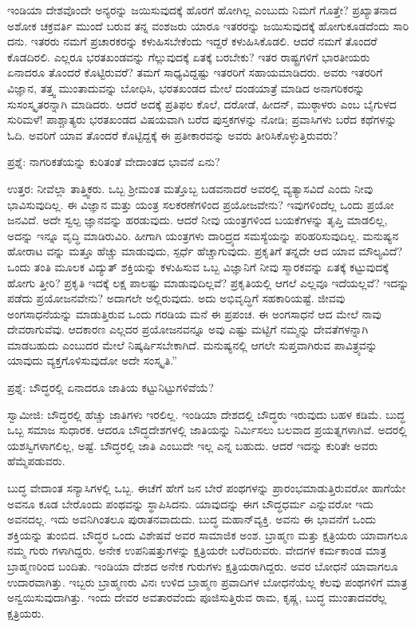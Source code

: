 ಇಂಡಿಯಾ ದೇಶವೊಂದೇ ಅನ್ಯರನ್ನು ಜಯಿಸುವುದಕ್ಕೆ ಹೊರಗೆ ಹೋಗಿಲ್ಲ ಎಂಬುದು ನಿಮಗೆ ಗೊತ್ತೇ? ಪ್ರಖ್ಯಾತನಾದ ಅಶೋಕ ಚಕ್ರವರ್ತಿ ಮುಂದೆ ಬರುವ ತನ್ನ ವಂಶಜರು ಯಾರೂ ಇತರರನ್ನು ಜಯಿಸುವುದಕ್ಕೆ ಹೋಗುಕೂಡದೆಂದು ಸಾರಿ ದನು. ಇತರರು ನಮಗೆ ಪ್ರಚಾರಕರನ್ನು ಕಳುಹಿಸಬೇಕೆಂದು ಇದ್ದರೆ ಕಳುಹಿಸಿಕೊಡಲಿ. ಆದರೆ ನಮಗೆ ತೊಂದರೆ ಕೊಡದಿರಲಿ. ಎಲ್ಲರೂ ಭರತಖಂಡವನ್ನು ಗೆಲ್ಲುವುದಕ್ಕೆ ಏತಕ್ಕೆ ಬರಬೇಕು? ಇತರ ರಾಷ್ಟ್ರಗಳಿಗೆ ಭಾರತೀಯರು ಏನಾದರೂ ತೊಂದರೆ ಕೊಟ್ಟಿರುವರೆ? ತಮಗೆ ಸಾಧ್ಯವಿದ್ದಷ್ಟು ಇತರರಿಗೆ ಸಹಾಯಮಾಡಿದರು. ಅವರು ಇತರರಿಗೆ ವಿಜ್ಞಾನ, ತತ್ತ್ವ ಮುಂತಾದುವನ್ನು ಬೋಧಿಸಿ, ಭರತಖಂಡದ ಮೇಲೆ ದಂಡಯಾತ್ರೆ ಮಾಡಿದ ಅನಾಗರಿಕರನ್ನು ಸುಸಂಸ್ಕೃತರನ್ನಾಗಿ ಮಾಡಿದರು. ಆದರೆ ಅದಕ್ಕೆ ಪ್ರತಿಫಲ ಕೊಲೆ, ದರೋಡೆ, ಹೀದನ್​, ಮುಠ್ಠಾಳರು ಎಂಬ ಬೈಗುಳದ ಸುರಿಮಳೆ! ಪಾಶ್ಚಾತ್ಯರು ಭರತಖಂಡದ ವಿಷಯವಾಗಿ ಬರೆದ ಪುಸ್ತಕಗಳನ್ನು ನೋಡಿ; ಪ್ರವಾಸಿಗಳು ಬರೆದ ಕಥೆಗಳನ್ನು ಓದಿ. ಅವರಿಗೆ ಯಾವ ತೊಂದರೆ ಕೊಟ್ಟಿದ್ದಕ್ಕೆ ಈ ಪ್ರತೀಕಾರವನ್ನು ಅವರು ತೀರಿಸಿಕೊಳ್ಳುತ್ತಿರುವರು?

ಪ್ರಶ್ನೆ: ನಾಗರಿಕತೆಯನ್ನು ಕುರಿತಂತೆ ವೇದಾಂತದ ಭಾವನೆ ಏನು?

ಉತ್ತರ: ನೀವೆಲ್ಲಾ ತಾತ್ತ್ವಿಕರು. ಒಬ್ಬ ಶ‍್ರೀಮಂತ ಮತ್ತೊಬ್ಬ ಬಡವನಾದರೆ ಅವರಲ್ಲಿ ವ್ಯತ್ಯಾಸವಿದೆ ಎಂದು ನೀವು ಭಾವಿಸುವುದಿಲ್ಲ. ಈ ವಿಜ್ಞಾನ ಮತ್ತು ಯಂತ್ರ ಸಲಕರಣೆಗಳಿಂದ ಪ್ರಯೋಜವೇನು? ಇವುಗಳಿಂದೆಲ್ಲ ಒಂದು ಪ್ರಯೋ ಜನವಿದೆ. ಅದೇ ಸ್ವಲ್ಪ ಜ್ಞಾನವನ್ನು ಹರಡುವುದು. ಆದರೆ ನೀವು ಯಂತ್ರಗಳಿಂದ ಬಯಕೆಗಳನ್ನು ತೃಪ್ತಿ ಮಾಡಲಿಲ್ಲ, ಅದನ್ನು ಇನ್ನೂ ವೃದ್ಧಿ ಮಾಡಿರುವಿರಿ. ಹೀಗಾಗಿ ಯಂತ್ರಗಳು ದಾರಿದ್ರ್ಯದ ಸಮಸ್ಯೆಯನ್ನು ಪರಿಹರಿಸುವುದಿಲ್ಲ. ಮನುಷ್ಯನ ಹೋರಾಟ ವನ್ನು ಮತ್ತೂ ಹೆಚ್ಚು ಮಾಡುವುದು, ಸ್ಪರ್ಧೆ ಹೆಚ್ಚಾಗುವುದು. ಪ್ರಕೃತಿಗೆ ತನ್ನದೇ ಆದ ಯಾವ ಮೌಲ್ಯವಿದೆ? ಒಂದು ತಂತಿ ಮೂಲಕ ವಿದ್ಯುತ್​ ಶಕ್ತಿಯನ್ನು ಕಳುಹಿಸುವ ಒಬ್ಬ ವಿಜ್ಞಾನಿಗೆ ನೀವು ಸ್ಮಾರಕವನ್ನು ಏತಕ್ಕೆ ಕಟ್ಟುವುದಕ್ಕೆ ಹೋಗು ತ್ತೀರಿ? ಪ್ರಕೃತಿ ಇದಕ್ಕೆ ಲಕ್ಷ ಪಾಲಷ್ಟು ಮಾಡುವುದಿಲ್ಲವೆ? ಪ್ರಕೃತಿಯಲ್ಲಿ ಆಗಲೆ ಎಲ್ಲವೂ ಇದೆಯಲ್ಲವೆ? ಇದನ್ನು ಪಡೆದು ಪ್ರಯೋಜನವೇನು? ಅದಾಗಲೇ ಅಲ್ಲಿರುವುದು. ಅದು ಅಭಿವೃದ್ಧಿಗೆ ಸಹಕಾರಿಯಷ್ಟೆ. ಜೀವವು ಅಂಗಸಾಧನೆಯನ್ನು ಮಾಡುತ್ತಿರುವ ಒಂದು ಗರಡಿಯ ಮನೆ ಈ ಪ್ರಪಂಚ. ಈ ಅಂಗಸಾಧನೆ ಆದ ಮೇಲೆ ನಾವು ದೇವರಾಗುವೆವು. ಆದಕಾರಣ ಎಲ್ಲದರ ಪ್ರಯೋಜನವನ್ನೂ ಅವು ಎಷ್ಟು ಮಟ್ಟಿಗೆ ನಮ್ಮನ್ನು ದೇವತೆಗಳನ್ನಾಗಿ ಮಾಡಬಹುದು ಎಂಬುದರ ಮೇಲೆ ನಿಷ್ಕರ್ಷಿಸಬೇಕಾಗಿದೆ. ಮನುಷ್ಯನಲ್ಲಿ ಆಗಲೇ ಸುಪ್ತವಾಗಿರುವ ಪಾವಿತ್ರ್ಯವನ್ನು ಯಾವುದು ವ್ಯಕ್ತಗೊಳಿಸುವುದೋ ಅದೇ ಸಂಸ್ಕೃತಿ.”

ಪ್ರಶ್ನೆ: ಬೌದ್ಧರಲ್ಲಿ ಏನಾದರೂ ಜಾತಿಯ ಕಟ್ಟುನಿಟ್ಟುಗಳಿವೆಯೆ?

ಸ್ವಾಮೀಜಿ: ಬೌದ್ಧರಲ್ಲಿ ಹೆಚ್ಚು ಜಾತಿಗಳು ಇರಲಿಲ್ಲ. ಇಂಡಿಯಾ ದೇಶದಲ್ಲಿ ಬೌದ್ಧರು ಇರುವುದು ಬಹಳ ಕಡಿಮೆ. ಬುದ್ಧ ಒಬ್ಬ ಸಮಾಜ ಸುಧಾರಕ. ಆದರೂ ಬೌದ್ಧದೇಶಗಳಲ್ಲಿ ಜಾತಿಯನ್ನು ನಿರ್ಮಿಸಲು ಬಲವಾದ ಪ್ರಯತ್ನಗಳಾಗಿವೆ. ಅದರಲ್ಲಿ ಯಶಸ್ವಿಗಳಾಗಲಿಲ್ಲ, ಅಷ್ಟೆ. ಬೌದ್ಧರಲ್ಲಿ ಜಾತಿ ಎಂಬುದೇ ಇಲ್ಲ ಎನ್ನ ಬಹುದು. ಆದರೆ ಇದನ್ನು ಕುರಿತೇ ಅವರು ಹೆಮ್ಮೆಪಡುವರು.

ಬುದ್ಧ ವೇದಾಂತ ಸನ್ಯಾಸಿಗಳಲ್ಲಿ ಒಬ್ಬ. ಈಚೆಗೆ ಹೇಗೆ ಜನ ಬೇರೆ ಪಂಥಗಳನ್ನು ಪ್ರಾರಂಭಮಾಡುತ್ತಿರುವರೋ ಹಾಗೆಯೇ ಅವನೂ ಕೂಡ ಬೇರೊಂದು ಪಂಥವನ್ನು ಸ್ಥಾಪಿಸಿದನು. ಯಾವುದನ್ನು ಈಗ ಬೌದ್ಧಧರ್ಮ ಎನ್ನುವರೋ ಇದು ಅವನದಲ್ಲ. ಇದು ಅವನಿಗಿಂತಲೂ ಪುರಾತನವಾದುದು. ಬುದ್ಧ ಮಹಾನ್​ವ್ಯಕ್ತಿ. ಅವನು ಈ ಭಾವನೆಗೆ ಒಂದು ಶಕ್ತಿಯನ್ನು ತುಂಬಿದ. ಬೌದ್ಧರ ಒಂದು ವಿಶೇಷವೆ ಅವರ ಸಾಮಾಜಿಕ ಅಂಶ. ಬ್ರಾಹ್ಮಣ ಮತ್ತು ಕ್ಷತ್ರಿಯರು ಯಾವಾಗಲೂ ನಮ್ಮ ಗುರು ಗಳಾಗಿದ್ದರು. ಅನೇಕ ಉಪನಿಷತ್ತುಗಳನ್ನು ಕ್ಷತ್ರಿಯರೇ ಬರೆದಿರುವರು. ವೇದಗಳ ಕರ್ಮಕಾಂಡ ಮಾತ್ರ ಬ್ರಾಹ್ಮಣರಿಂದ ಬಂದಿತು. ಇಂಡಿಯಾ ದೇಶದ ಅನೇಕ ಗುರುಗಳು ಕ್ಷತ್ರಿಯರಾಗಿದ್ದರು. ಅವರ ಬೋಧನೆ ಯಾವಾಗಲೂ ಉದಾರವಾಗಿತ್ತು. ಇಬ್ಬರು ಬ್ರಾಹ್ಮಣರು ವಿನಃ ಉಳಿದ ಬ್ರಾಹ್ಮಣ ಪ್ರವಾದಿಗಳ ಬೋಧನೆಯೆಲ್ಲ ಕೆಲವು ಪಂಥಗಳಿಗೆ ಮಾತ್ರ ಅನ್ವಯಿಸುವುದಾಗಿತ್ತು. ಇಂದು ದೇವರ ಅವತಾರವೆಂದು ಪೂಜಿಸುತ್ತಿರುವ ರಾಮ, ಕೃಷ್ಣ, ಬುದ್ಧ ಮುಂತಾದವರೆಲ್ಲ ಕ್ಷತ್ರಿಯರು.

